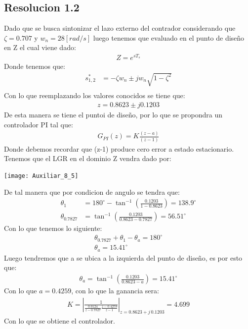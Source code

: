\documentclass[
  11pt,
  letterpaper,
   addpoints,
  ]{exam}
\begin{document}
\begin{questions}
\begin{solution}
    \subsection*{Resolucion 1.2}
    Dado que se busca sintonizar el lazo externo del contrador considerando que $\zeta = 0.707$ y $w_{n} = 28[rad/s]$ luego tenemos que evaluado en el punto de diseño en Z el cual viene dado:
    \begin{align}
        Z= e^{sT_{s}}
    \end{align}
    Donde tenemos que:
    \begin{align}
        s_{1,2}^{*} &= -\zeta w_{n} \pm jw_{n}\sqrt{1-\zeta^{2}}\\
    \end{align}
    Con lo que reemplazando los valores conocidos se tiene que:
    \begin{align}
        z= 0.8623 \pm j0.1203
    \end{align}
    De esta manera se tiene el puntoi de diseño, por lo que se propondra un controlador PI tal que:
    \begin{align}
        G_{PI}(z) = K\frac{(z-a)}{(z-1)}
    \end{align}
    Donde debemos recordar que (z-1) produce cero error a estado estacionario. Tenemos que el LGR en el dominio Z vendra dado por:
    \begin{center}
        \texttt{[image: Auxiliar\_8\_5]}
    \end{center}
    De tal manera que por condicion de angulo se tendra que:
    \begin{align}
        \theta_{1} &= 180^{\circ} - \tan^{-1}\left(\frac{0.1203}{1-0.8623}\right) = 138.9^{\circ}\\
        \theta_{0.7827} & = \tan^{-1}\left(\frac{0.1203}{0.8623-0.7827}\right) = 56.51^{\circ}
    \end{align}
    Con lo que tenemos lo siguiente:
    \begin{align}
        \theta_{0.7827} + \theta_{1} - \theta_{a} = 180^{\circ}\\
        \theta_{a} = 15.41^{\circ}
    \end{align}
    Luego tendremos que a se ubica a la izquierda del punto de diseño, es por esto que:
    \begin{align}
        \theta_{a} = \tan^{-1}\left(\frac{0.1203}{0.8623-a}\right) = 15.41^{\circ}
    \end{align}
    Con lo que $a=0.4259$, con lo que la ganancia sera:
    \begin{align}
        K = \left| \frac{1}{\frac{0.0124}{z-0.7827} \frac{z-0.4259}{z-1}}\right|_{z = 0.8623 + j \, 0.1203} = 4.699
    \end{align}
    Con lo que se obtiene el controlador.

\end{solution}
\end{questions}
\end{document}
